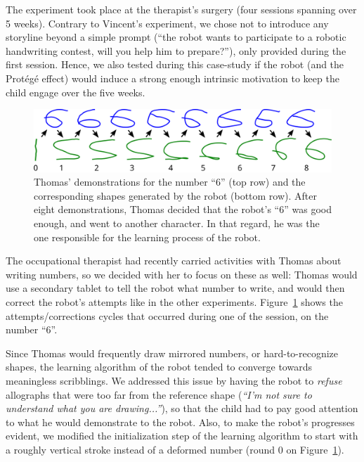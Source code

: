 \documentclass{article}
\begin{document}
The experiment took place at the therapist's surgery (four sessions spanning
over 5 weeks). Contrary to Vincent's experiment, we chose not to introduce any
storyline beyond a simple prompt (``the robot wants to participate to a robotic
handwriting contest, will you help him to prepare?''), only provided during the
first session. Hence, we also tested during this case-study if the robot (and
the Prot\'eg\'e effect) would induce a strong enough intrinsic motivation to
keep the child engage over the five weeks.

\begin{figure}
    \centering
    \includegraphics[width=0.9\linewidth]{learning_6_demos}
    \caption{\small Thomas' demonstrations for the number ``6'' (top row) and
        the corresponding shapes generated by the robot (bottom row). After
        eight demonstrations, Thomas decided that the robot's ``6'' was good enough,
        and went to another character. In that regard, he was the one
        responsible for the learning process of the robot.}

    \label{learning_6_demos}
\end{figure}


The occupational therapist had recently carried activities with Thomas about
writing numbers, so we decided with her to focus on these as well: Thomas would
use a secondary tablet to tell the robot what number to write, and would then
correct the robot's attempts like in the other experiments.
Figure~\ref{learning_6_demos} shows the attempts/corrections cycles that
occurred during one of the session, on the number ``6''.


Since Thomas would frequently draw mirrored numbers, or hard-to-recognize
shapes, the learning algorithm of the robot tended to converge towards
meaningless scribblings. We addressed this issue by having the robot to
\emph{refuse} allographs that were too far from the reference shape (\emph{``I'm
not sure to understand what you are drawing...''}), so that the child had to
pay good attention to what he would demonstrate to the robot. Also, to make
the robot's progresses evident, we modified the initialization step of the
learning algorithm to start with a roughly vertical stroke instead of a
deformed number (round 0 on Figure~\ref{learning_6_demos}).
\end{document}
